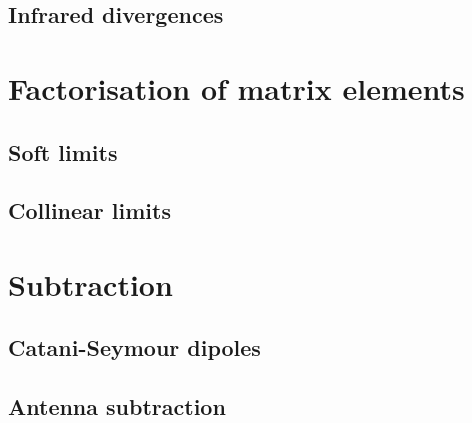 \documentclass[main.tex]{subfiles}
\begin{document}
\subsection{Infrared divergences}
\section{Factorisation of matrix elements}
\subsection{Soft limits}
\subsection{Collinear limits}

\section{Subtraction}
\subsection{Catani-Seymour dipoles}
\subsection{Antenna subtraction}
\end{document}
